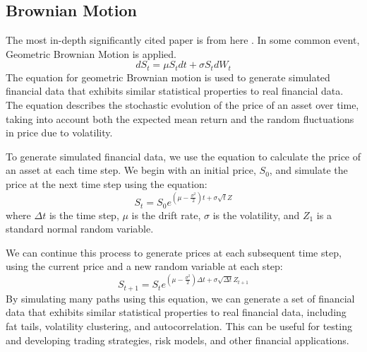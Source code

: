 \documentclass{article}
\begin{document}
\subsection{Brownian Motion}
\label{sec:others}
The most in-depth significantly cited paper is from here \cite{campbell1997econometric}. 
In some common event, Geometric Brownian Motion is applied.
\begin{equation}
dS_t = \mu S_t dt + \sigma S_t dW_t
\end{equation}
The equation for geometric Brownian motion is used to 
generate simulated financial data that exhibits similar 
statistical properties to real financial data. 
The equation describes the stochastic evolution 
of the price of an asset over time, 
taking into account both the expected mean 
return and the random fluctuations in price due to volatility.

To generate simulated financial data, we use the equation to calculate the price of an asset at each time step. We begin with an initial price, $S_0$, and simulate the price at the next time step using the equation:
\begin{equation}
	S_{t} = S_{0} e^{(\mu - \frac{\sigma^2}{2})t + \sigma \sqrt{t}Z}
\end{equation}
where $\Delta t$ is the time step, $\mu$ is the drift rate, $\sigma$ is the volatility, and $Z_1$ is a standard normal random variable.

We can continue this process to generate prices at each subsequent time step, using the current price and a new random variable at each step:
\begin{equation}
	S_{t+1} = S_{t} e^{(\mu - \frac{\sigma^2}{2})\Delta t + \sigma \sqrt{\Delta t}Z_{t+1}}
\end{equation}
By simulating many paths using this equation, we can generate a set of financial data that exhibits similar statistical properties to real financial data, including fat tails, volatility clustering, and autocorrelation. This can be useful for testing and developing trading strategies, risk models, and other financial applications.
\end{document}
